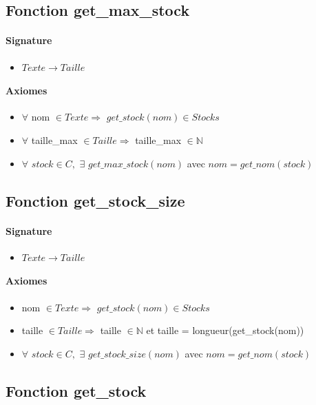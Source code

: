 \documentclass[]{article}
\begin{document}
\subsection*{Fonction get\_max\_stock}
\paragraph{Signature}
\begin{itemize}
\item
  $Texte \longrightarrow  Taille$
\end{itemize}
\paragraph{Axiomes}
\begin{itemize}
\item
   $\forall$ nom $\in Texte \Rightarrow$ $get\_stock(nom) \in Stocks$
\item
   $\forall$ taille\_max $\in Taille \Rightarrow$ taille\_max $\in \mathbb{N}$
 \item
   $\forall$ $stock \in C,$ $ \exists $ $get\_max\_stock(nom) $ avec $ nom=get\_nom(stock)$
\end{itemize}

\subsection*{Fonction get\_stock\_size}
\paragraph{Signature}
\begin{itemize}
\item
  $Texte \longrightarrow  Taille$
\end{itemize}
\paragraph{Axiomes}
\begin{itemize}
\item
   nom $\in Texte \Rightarrow$ $get\_stock(nom) \in Stocks$
\item
   taille $\in Taille \Rightarrow$ taille $\in \mathbb{N}$ et taille = longueur(get\_stock(nom))
 \item
   $\forall$ $stock \in C,$ $ \exists $ $get\_stock\_size(nom) $ avec $ nom=get\_nom(stock)$
\end{itemize}

\subsection*{Fonction get\_stock}
\end{document}

